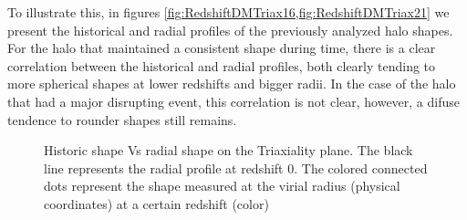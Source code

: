 To illustrate this, in figures \ref{fig:RedshiftDMTriax16,fig:RedshiftDMTriax21} we present the historical and radial profiles of the previously analyzed halo shapes. For the halo that maintained a consistent shape during time, there is a clear correlation between the historical and radial profiles, both clearly tending to more spherical shapes at lower redshifts and bigger radii. In the case of the halo that had a major disrupting event, this correlation is not clear, however, a difuse tendence to rounder shapes still remains.\\  

\begin{figure}[!ht]
  \centering
  \hfill
  \caption{Historic shape Vs radial shape on the Triaxiality plane. The black line represents the radial profile at redshift 0. The colored connected dots represent the shape measured at the virial radius (physical coordinates) at a certain redshift (color)}
\end{figure}







 
